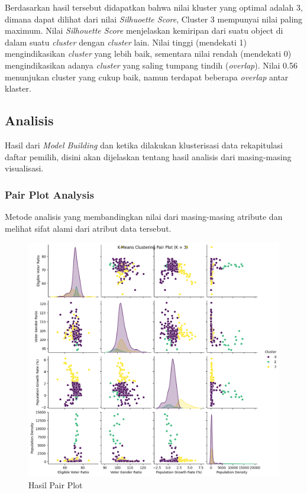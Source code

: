 Berdasarkan hasil tersebut didapatkan bahwa nilai kluster yang optimal adalah 3, dimana dapat dilihat dari nilai \textit{Silhuoette Score}, Cluster 3 mempunyai nilai paling maximum. Nilai \textit{Silhouette Score} menjelaskan kemiripan dari suatu object di dalam suatu \textit{cluster} dengan \textit{cluster} lain. Nilai tinggi (mendekati 1) mengindikasikan \textit{cluster} yang lebih baik, sementara nilai rendah (mendekati 0) mengindikasikan adanya \textit{cluster} yang saling tumpang tindih (\textit{overlap}). Nilai 0.56 menunjukan cluster yang cukup baik, namun terdapat beberapa \textit{overlap} antar klaster.

\subsection{Analisis}
Hasil dari \textit{Model Building} dan ketika dilakukan klusterisasi data rekapitulasi daftar pemilih, disini akan dijelaskan tentang hasil analisis dari masing-masing visualisasi.

\subsubsection{Pair Plot Analysis}
Metode analisis yang membandingkan nilai dari masing-masing atribute dan melihat sifat alami dari atribut data tersebut.
\begin{figure}[h]
    \centering
    \includegraphics[width=1\linewidth]{images/pair_plot_analysis.png}
    \caption{Hasil Pair Plot}
    \label{fig:pair_plot}
\end{figure}

